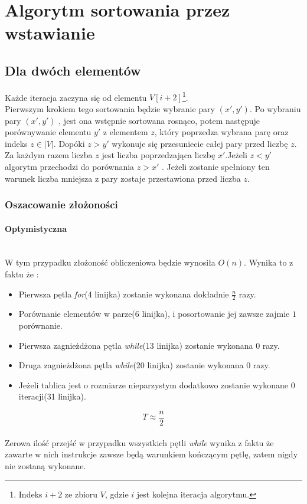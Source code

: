 \section{Algorytm sortowania przez wstawianie}

\subsection{Dla dwóch elementów}
 Każde iteracja zaczyna się od elementu $V[i+2]$\footnote{Indeks $i+2$ ze zbioru $V$, gdzie $i$ jest kolejna iteracja algorytmu.}.\\
Pierwszym krokiem tego sortowania będzie wybranie  pary $(x',y')$. Po wybraniu pary $(x',y')$ , jest ona wstępnie sortowana rosnąco, potem następuje porównywanie elementu $y'$ z elementem $z$, który poprzedza wybrana parę oraz indeks $z \in \lvert V \rvert $. Dopóki  $z > y'$  wykonuje się przesuniecie całej pary przed liczbę $z$. Za każdym razem liczba $z$ jest liczba poprzedzająca liczbę $x'$.Jeżeli  $z < y'$ algorytm przechodzi do porównania $z > x'$ . Jeżeli zostanie spełniony ten warunek liczba mniejsza z pary zostaje przestawiona przed liczba $z$.
\subsubsection{Oszacowanie złożoności}
\paragraph{Optymistyczna}\mbox{}\\
W tym przypadku złożoność obliczeniowa będzie wynosiła $O(n)$.
Wynika to z faktu że :
\begin{itemize}
\item Pierwsza pętla \textit{for}(4 linijka) zostanie wykonana dokładnie $\frac{n}{2}$ razy.
\item Porównanie elementów w parze(6 linijka), i posortowanie jej zawsze zajmie $1$ porównanie.
\item Pierwsza zagnieżdżona pętla \textit{while}(13 linijka) zostanie wykonana $0$ razy.
\item Druga zagnieżdżona pętla \textit{while}(20 linijka) zostanie wykonana $0$ razy.
\item Jeżeli tablica jest o rozmiarze nieparzystym dodatkowo zostanie wykonane $0$ iteracji(31 linijka).
\end{itemize}
\begin{equation}
T \approx \frac{n}{2} 
\end{equation}
\wyjT \\
Zerowa ilość przejść w przypadku wszystkich pętli \textit{while} wynika z faktu że zawarte w nich instrukcje zawsze będą warunkiem kończącym pętlę, zatem nigdy nie zostaną wykonane.

